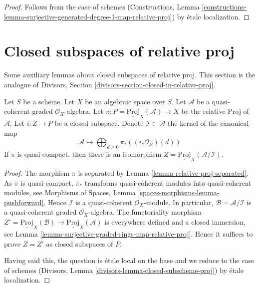 \begin{proof}
Follows from the case of schemes
(Constructions, Lemma
\ref{constructions-lemma-surjective-generated-degree-1-map-relative-proj})
by \'etale localization.
\end{proof}



















\section{Closed subspaces of relative proj}
\label{section-closed-in-relative-proj}

\noindent
Some auxiliary lemmas about closed subspaces of relative proj.
This section is the analogue of
Divisors, Section \ref{divisors-section-closed-in-relative-proj}.

\begin{lemma}
\label{lemma-closed-subscheme-proj}
Let $S$ be a scheme. Let $X$ be an algebraic space over $S$.
Let $\mathcal{A}$ be a quasi-coherent graded $\mathcal{O}_X$-algebra. Let
$\pi : P = \underline{\text{Proj}}_X(\mathcal{A}) \to X$ be the relative
Proj of $\mathcal{A}$. Let $i : Z \to P$ be a closed subspace. Denote
$\mathcal{I} \subset \mathcal{A}$ the kernel of the canonical map
$$
\mathcal{A}
\longrightarrow
\bigoplus\nolimits_{d \geq 0} \pi_*\left((i_*\mathcal{O}_Z)(d)\right)
$$
If $\pi$ is quasi-compact, then there is an isomorphism
$Z = \underline{\text{Proj}}_X(\mathcal{A}/\mathcal{I})$.
\end{lemma}

\begin{proof}
The morphism $\pi$ is separated by
Lemma \ref{lemma-relative-proj-separated}.
As $\pi$ is quasi-compact, $\pi_*$ transforms quasi-coherent modules
into quasi-coherent modules, see
Morphisms of Spaces, Lemma \ref{spaces-morphisms-lemma-pushforward}.
Hence $\mathcal{I}$ is a quasi-coherent $\mathcal{O}_X$-module.
In particular, $\mathcal{B} = \mathcal{A}/\mathcal{I}$ is a
quasi-coherent graded $\mathcal{O}_X$-algebra. The functoriality
morphism $Z' = \underline{\text{Proj}}_X(\mathcal{B}) \to
\underline{\text{Proj}}_X(\mathcal{A})$ is everywhere defined and
a closed immersion, see Lemma
\ref{lemma-surjective-graded-rings-map-relative-proj}.
Hence it suffices to prove $Z = Z'$ as closed subspaces of $P$.

\medskip\noindent
Having said this, the question is \'etale local on the base and we
reduce to the case of schemes
(Divisors, Lemma \ref{divisors-lemma-closed-subscheme-proj})
by \'etale localization.
\end{proof}

